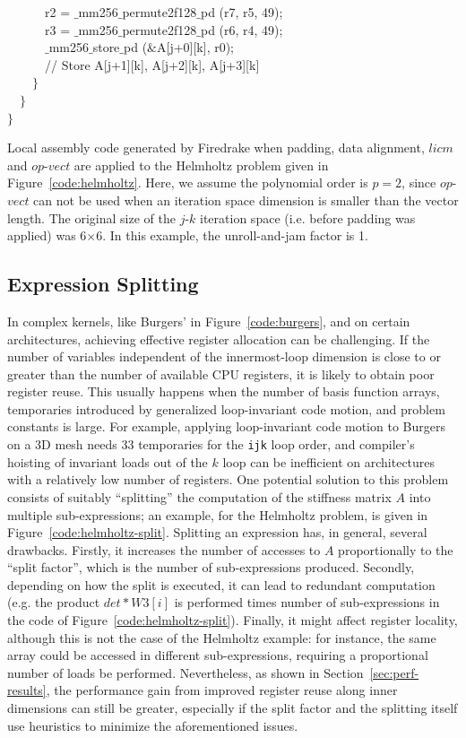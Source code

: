 \documentclass[conference]{IEEEtran}
\begin{document}
\begin{algorithm}[t]
~~~~~~r2 = $\_$mm256$\_$permute2f128$\_$pd (r7, r5, 49);\\
~~~~~~r3 = $\_$mm256$\_$permute2f128$\_$pd (r6, r4, 49);\\
~~~~~~$\_$mm256$\_$store$\_$pd ($\&$A[j+0][k], r0);\\
~~~~~~// Store A[j+1][k], A[j+2][k], A[j+3][k]\\
~~~~$\rbrace$\\
~~$\rbrace$\\
$\rbrace$
\caption{Local assembly code generated by Firedrake when padding, data alignment, $licm$ and $op$-$vect$ are applied to the Helmholtz problem given in Figure~\ref{code:helmholtz}. Here, we assume the polynomial order is $p=2$, since $op$-$vect$ can not be used when an iteration space dimension is smaller than the vector length. The original size of the $j$-$k$ iteration space (i.e. before padding was applied) was 6$\times$6. In this example, the unroll-and-jam factor is 1.}
\label{code:helmholtz-opvect}
\end{algorithm}


\subsection{Expression Splitting}
\label{sec:expr-split}
In complex kernels, like Burgers' in Figure~\ref{code:burgers}, and on certain architectures, achieving effective register allocation can be challenging. If the number of variables independent of the innermost-loop dimension is close to or greater than the number of available CPU registers, it is likely to obtain poor register reuse. This usually happens when the number of basis function arrays, temporaries introduced by generalized loop-invariant code motion, and problem constants is large. For example, applying loop-invariant code motion to Burgers on a 3D mesh needs 33 temporaries for the \texttt{ijk} loop order, and compiler's hoisting of invariant loads out of the $k$ loop can be inefficient on architectures with a relatively low number of registers. One potential solution to this problem consists of suitably ``splitting'' the computation of the stiffness matrix $A$ into multiple sub-expressions; an example, for the Helmholtz problem, is given in Figure~\ref{code:helmholtz-split}. Splitting an expression has, in general, several drawbacks. Firstly, it increases the number of accesses to $A$ proportionally to the ``split factor'', which is the number of sub-expressions produced. Secondly, depending on how the split is executed, it can lead to redundant computation (e.g. the product $det*W3[i]$ is performed times number of sub-expressions in the code of Figure~\ref{code:helmholtz-split}). Finally, it might affect register locality, although this is not the case of the Helmholtz example: for instance, the same array could be accessed in different sub-expressions, requiring a proportional number of loads be performed. Nevertheless, as shown in Section~\ref{sec:perf-results}, the performance gain from improved register reuse along inner dimensions can still be greater, especially if the split factor and the splitting itself use heuristics to minimize the aforementioned issues.
\end{document}
